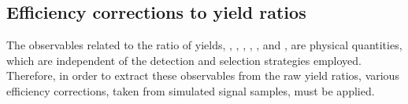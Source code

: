 {\footnotesize
\begin{table}[h]
\caption{Detection asymmetry factors for each of the observables in the \CP fit.}
\label{detectionasymmetry}
\end{table}}

\subsection{Efficiency corrections to yield ratios}
\label{sec:cpfit:efficiencies}

The \CP observables related to the ratio of yields, \Rkk, \Rpipi, \Rptwo, \Rmtwo, \Rpipipipi, \Rpfour and \Rmfour, are physical quantities, which are independent of the detection and selection strategies employed. Therefore, in order to extract these \CP observables from the raw yield ratios, various efficiency corrections, taken from simulated signal samples, must be applied.

